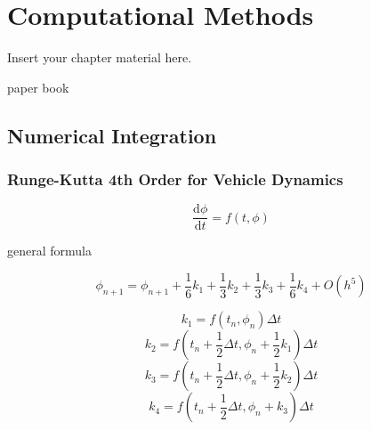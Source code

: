 
\chapter{Computational Methods}
\label{chapter:computational_methods}

Insert your chapter material here.

paper \cite{arnold_numerical_2011} book \cite{press_numerical_2007}


\section{Numerical Integration}

\subsection{Runge-Kutta 4th Order for Vehicle Dynamics}

\begin{equation}
    \frac{\mathrm{d}\phi}{\mathrm{d}t} = f(t, \phi)
\end{equation}


general formula

\begin{equation}
    \phi_{n+1} = \phi_{n+1} + \frac{1}{6} k_1 + \frac{1}{3} k_2 + \frac{1}{3} k_3 + \frac{1}{6} k_4 + O(h^5)
\end{equation}


\begin{equation}
    k_1 = f\left(t_n, \phi_n\right) \Delta t
\end{equation}
\begin{equation}
    k_2 = f\left(t_n + \frac{1}{2}\Delta t, \phi_n + \frac{1}{2} k_1\right) \Delta t
\end{equation}
\begin{equation}
    k_3 = f\left(t_n + \frac{1}{2}\Delta t, \phi_n + \frac{1}{2} k_2\right) \Delta t
\end{equation}
\begin{equation}
    k_4 = f\left(t_n + \frac{1}{2}\Delta t, \phi_n + k_3\right) \Delta t
\end{equation}

